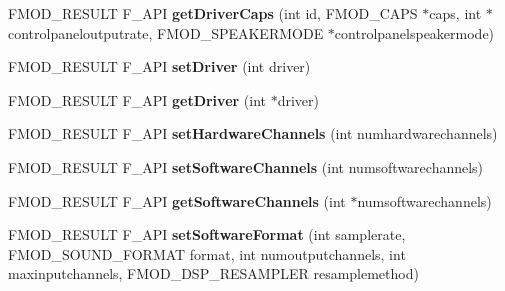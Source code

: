 \begin{DoxyCompactItemize}
\item 
F\+M\+O\+D\+\_\+\+R\+E\+S\+U\+LT F\+\_\+\+A\+PI {\bfseries get\+Driver\+Caps} (int id, F\+M\+O\+D\+\_\+\+C\+A\+PS $\ast$caps, int $\ast$controlpaneloutputrate, F\+M\+O\+D\+\_\+\+S\+P\+E\+A\+K\+E\+R\+M\+O\+DE $\ast$controlpanelspeakermode)\hypertarget{class_f_m_o_d_1_1_system_a94c535029424ae1b1416c7484683a783}{}\label{class_f_m_o_d_1_1_system_a94c535029424ae1b1416c7484683a783}

\item 
F\+M\+O\+D\+\_\+\+R\+E\+S\+U\+LT F\+\_\+\+A\+PI {\bfseries set\+Driver} (int driver)\hypertarget{class_f_m_o_d_1_1_system_a2ce18295f0e062054e1f8b9421788683}{}\label{class_f_m_o_d_1_1_system_a2ce18295f0e062054e1f8b9421788683}

\item 
F\+M\+O\+D\+\_\+\+R\+E\+S\+U\+LT F\+\_\+\+A\+PI {\bfseries get\+Driver} (int $\ast$driver)\hypertarget{class_f_m_o_d_1_1_system_aeba7030e04c4604da112264e3ddbb8e6}{}\label{class_f_m_o_d_1_1_system_aeba7030e04c4604da112264e3ddbb8e6}

\item 
F\+M\+O\+D\+\_\+\+R\+E\+S\+U\+LT F\+\_\+\+A\+PI {\bfseries set\+Hardware\+Channels} (int numhardwarechannels)\hypertarget{class_f_m_o_d_1_1_system_a0b4f6c60505418445a9d8607ac00fca1}{}\label{class_f_m_o_d_1_1_system_a0b4f6c60505418445a9d8607ac00fca1}

\item 
F\+M\+O\+D\+\_\+\+R\+E\+S\+U\+LT F\+\_\+\+A\+PI {\bfseries set\+Software\+Channels} (int numsoftwarechannels)\hypertarget{class_f_m_o_d_1_1_system_ad12789aa16134fb66520aca1cb1419c6}{}\label{class_f_m_o_d_1_1_system_ad12789aa16134fb66520aca1cb1419c6}

\item 
F\+M\+O\+D\+\_\+\+R\+E\+S\+U\+LT F\+\_\+\+A\+PI {\bfseries get\+Software\+Channels} (int $\ast$numsoftwarechannels)\hypertarget{class_f_m_o_d_1_1_system_a210d30f8df72c80d31bc38f5a8e116d0}{}\label{class_f_m_o_d_1_1_system_a210d30f8df72c80d31bc38f5a8e116d0}

\item 
F\+M\+O\+D\+\_\+\+R\+E\+S\+U\+LT F\+\_\+\+A\+PI {\bfseries set\+Software\+Format} (int samplerate, F\+M\+O\+D\+\_\+\+S\+O\+U\+N\+D\+\_\+\+F\+O\+R\+M\+AT format, int numoutputchannels, int maxinputchannels, F\+M\+O\+D\+\_\+\+D\+S\+P\+\_\+\+R\+E\+S\+A\+M\+P\+L\+ER resamplemethod)\hypertarget{class_f_m_o_d_1_1_system_a1ad691b00d940df85a4bb1718fbf42e2}{}\label{class_f_m_o_d_1_1_system_a1ad691b00d940df85a4bb1718fbf42e2}


\end{DoxyCompactItemize}
